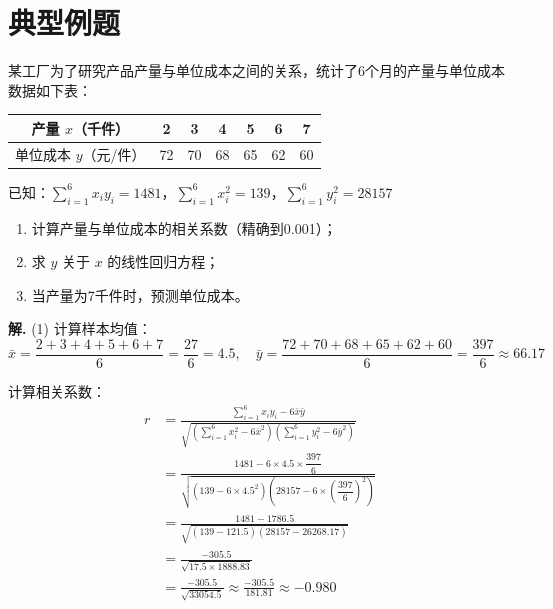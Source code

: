 \documentclass[11pt]{ctexrep}
\begin{document}
\section*{典型例题}

\begin{example}[相关系数的计算与判断]
    某工厂为了研究产品产量与单位成本之间的关系，统计了6个月的产量与单位成本数据如下表：

    \begin{center}
    \begin{tabular}{c|cccccc}
    \hline
    产量 $x$（千件） & 2 & 3 & 4 & 5 & 6 & 7 \\
    \hline
    单位成本 $y$（元/件） & 72 & 70 & 68 & 65 & 62 & 60 \\
    \hline
    \end{tabular}
    \end{center}

    已知：$\sum_{i=1}^{6}x_i y_i = 1481$，$\sum_{i=1}^{6}x_i^2 = 139$，$\sum_{i=1}^{6}y_i^2 = 28157$

    \begin{enumerate}
        \item 计算产量与单位成本的相关系数（精确到0.001）；
        \item 求 $y$ 关于 $x$ 的线性回归方程；
        \item 当产量为7千件时，预测单位成本。
    \end{enumerate}
\end{example}

\textbf{解.} (1) 计算样本均值：
\[
\bar{x} = \frac{2+3+4+5+6+7}{6} = \frac{27}{6} = 4.5, \quad \bar{y} = \frac{72+70+68+65+62+60}{6} = \frac{397}{6} \approx 66.17
\]

计算相关系数：
\begin{align*}
r &= \frac{\sum_{i=1}^{6}x_i y_i - 6\bar{x}\bar{y}}{\sqrt{\left(\sum_{i=1}^{6}x_i^2 - 6\bar{x}^2\right)\left(\sum_{i=1}^{6}y_i^2 - 6\bar{y}^2\right)}} \\
&= \frac{1481 - 6 \times 4.5 \times \dfrac{397}{6}}{\sqrt{\left(139 - 6 \times 4.5^2\right)\left(28157 - 6 \times \left(\dfrac{397}{6}\right)^2\right)}} \\
&= \frac{1481 - 1786.5}{\sqrt{(139 - 121.5)(28157 - 26268.17)}} \\
&= \frac{-305.5}{\sqrt{17.5 \times 1888.83}} \\
&= \frac{-305.5}{\sqrt{33054.5}} \approx \frac{-305.5}{181.81} \approx -0.980
\end{align*}
\end{document}
